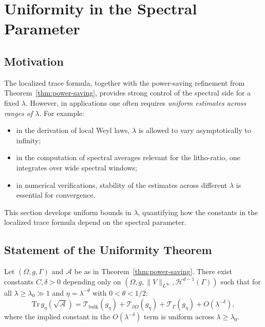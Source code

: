 \section{Uniformity in the Spectral Parameter}
\label{sec:uniformity}

\subsection{Motivation}

The localized trace formula, together with the power-saving refinement
from Theorem~\ref{thm:power-saving}, provides strong control of the
spectral side for a fixed $\lambda$.  
However, in applications one often requires \emph{uniform estimates across
ranges of $\lambda$}. For example:

\begin{itemize}
  \item in the derivation of local Weyl laws, $\lambda$ is allowed to
  vary asymptotically to infinity;
  \item in the computation of spectral averages relevant for the
  litho-ratio, one integrates over wide spectral windows;
  \item in numerical verifications, stability of the estimates across
  different $\lambda$ is essential for convergence.
\end{itemize}

This section develops uniform bounds in $\lambda$, quantifying how the
constants in the localized trace formula depend on the spectral
parameter.

\subsection{Statement of the Uniformity Theorem}

\begin{theorem}
\label{thm:uniform-trace}
Let $(\Omega,g,\Gamma)$ and $\mathcal{A}$ be as in
Theorem~\ref{thm:power-saving}.
There exist constants $C, \delta > 0$ depending only on
$(\Omega,g,\|V\|_{L^\infty}, \mathcal{H}^{d-1}(\Gamma))$ such that
for all $\lambda \geq \lambda_0 \gg 1$ and
$\eta = \lambda^{-\theta}$ with $0 < \theta < 1/2$:
\[
\mathrm{Tr}\, g_\eta(\sqrt{\mathcal{A}}) =
\mathcal{T}_{\mathrm{bulk}}(g_\eta) +
\mathcal{T}_{\partial \Omega}(g_\eta) +
\mathcal{T}_\Gamma(g_\eta) +
O(\lambda^{-\delta}),
\]
where the implied constant in the $O(\lambda^{-\delta})$ term
is uniform across $\lambda \geq \lambda_0$.
\end{theorem}

